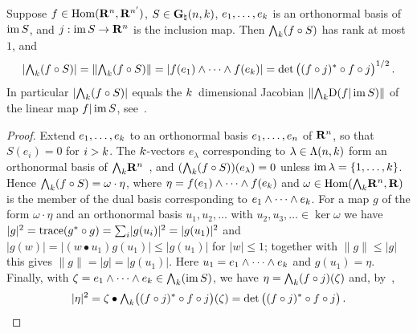 \begin{lemma}
    \label{al:2.4}
    Suppose $f \in \operatorname{Hom}(\mathbf{R}^{n},\mathbf{R}^{n'})$, $S \in \mathbf{G}_{\natural}(n,k)$, $e_1, \ldots,
    e_{k}$ is an orthonormal basis of $\operatorname{im} S$, and $j : \operatorname{im} S \to \mathbf{R}^{n}$ is the
    inclusion map. Then ${\textstyle\boldsymbol{\bigwedge}}_{{k}}(f \circ S)$ has rank at most~$1$, and
    \begin{displaymath}
        |{\textstyle\boldsymbol{\bigwedge}}_{{k}}(f \circ S)| = \|{\textstyle\boldsymbol{\bigwedge}}_{{k}}(f \circ S)\| = |f(e_1) \wedge \cdots
        \wedge f(e_{k})| = \det \big( (f \circ j)^{*} \circ f \circ j \big)^{1/2} \,.
    \end{displaymath}
    In particular $|{\textstyle\boldsymbol{\bigwedge}}_{{k}}(f \circ S)|$ equals the $k$~dimensional Jacobian
    $\|{\textstyle\boldsymbol{\bigwedge}}_{{k}} \mathrm{D} (f|\operatorname{im} S)\|$ of the linear map $f | \operatorname{im} S$, see~\cite[3.2.1]{Federer1969}.
\end{lemma}

\begin{proof}
    Extend $e_1, \ldots, e_{k}$ to an orthonormal basis $e_1, \ldots, e_{n}$ of
    $\mathbf{R}^{n}$, so that $S(e_i) = 0$ for $i > k$. The $k$-vectors $e_\lambda$
    corresponding to $\lambda \in \Lambda(n,k)$ form an orthonormal basis of
    ${\textstyle\boldsymbol{\bigwedge}}_{{k}} \mathbf{R}^{n}$~\cite[1.7.5]{Federer1969}, and $({\textstyle\boldsymbol{\bigwedge}}_{{k}}(f \circ
    S))(e_\lambda) = 0$ unless $\operatorname{im} \lambda = \{1, \ldots, k\}$. Hence ${\textstyle\boldsymbol{\bigwedge}}_{{k}}(f
    \circ S) = \omega \cdot \eta$, where $\eta = f(e_1) \wedge \cdots \wedge f(e_{k})$ and
    $\omega \in \operatorname{Hom}({\textstyle\boldsymbol{\bigwedge}}_{{k}} \mathbf{R}^{n}, \mathbf{R})$ is the member of the dual basis
    corresponding to $e_1 \wedge \cdots \wedge e_{k}$. For a map $g$ of the form $\omega
    \cdot \eta$ and an orthonormal basis $u_1, u_2, \ldots$ with $u_2, u_3, \ldots \in \ker
    \omega$ we have $|g|^2 = \operatorname{trace}(g^{*} \circ g) = {\textstyle\sum_{i}^{}} |g(u_i)|^2 =
    |g(u_1)|^2$ and $|g(w)| = |(w \bullet u_1) g(u_1)| \le |g(u_1)|$ for $|w| \le 1$; together
    with $\|g\| \le |g|$ this gives $\|g\| = |g| = |g(u_1)|$. Here $u_1 = e_1 \wedge \cdots
    \wedge e_{k}$ and $g(u_1) = \eta$. Finally, with $\zeta = e_1 \wedge \cdots \wedge
    e_{k} \in {\textstyle\boldsymbol{\bigwedge}}_{{k}}(\operatorname{im} S)$, we have $\eta = {\textstyle\boldsymbol{\bigwedge}}_{{k}}(f \circ j)(\zeta)$
    and, by~\cite[1.7.6, 1.3.4]{Federer1969},
    \begin{displaymath}
        |\eta|^2 = \zeta \bullet {\textstyle\boldsymbol{\bigwedge}}_{{k}} \big( (f \circ j)^{*} \circ f \circ j
        \big) (\zeta) = \det \big( (f \circ j)^{*} \circ f \circ j \big) \,. \qedhere
    \end{displaymath}
\end{proof}

